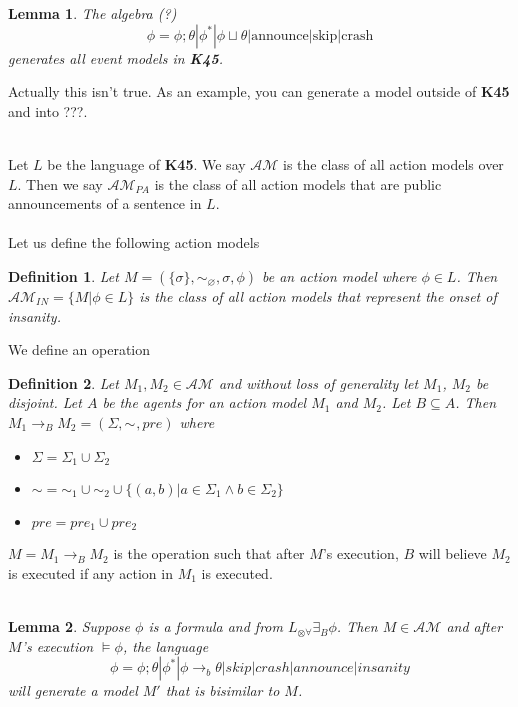 \documentclass[12pt, a4paper, titlepage]{scrartcl}
\newcommand{\aRel}[1] {
  \sim_{#1} 
}
\newcommand{\actModel}[3]{
  (#1, \aRel{#2}, #3)
}
\newtheorem{defn}{Definition}
\newtheorem{lemma}{Lemma}
\begin{document}
\begin{lemma}
	The algebra (?)
	\[
		\phi = \phi ; \theta | \phi ^{\ast} | \phi \sqcup \theta | \text{announce} |
		\text{skip} | \text{crash}
	\]
	generates all event models in {\bf K45}.
\end{lemma}

\begin{note}
	Actually this isn't true.
	As an example, you can generate a model outside of {\bf K45} and into ???.\\
\end{note}
\\
Let $L$ be the language of {\bf K45}.
We say $\mathcal{AM}$ is the class of all action models over $L$.
Then we say $\mathcal{AM}_{PA}$ is the class of all action models that
are public announcements of a sentence in $L$.\\
\\
Let us define the following action models
\begin{defn} \label{insanity}
Let $M = \actModel{\{\sigma\}}{\varnothing}{{\sigma, \phi}}$ be an action model
where $\phi \in L$.
Then $\mathcal{AM}_{IN} = \{M | \phi \in L\}$ is the class of all action models
that represent the onset of insanity.
\end{defn}

We define an operation
\begin{defn} \label{believe}
Let $M_1, M_2 \in \mathcal{AM}$ and without loss of generality let $M_1$, $M_2$
be disjoint.
Let $A$ be the agents for an action model $M_1$ and $M_2$.
Let $B \subseteq A$.
Then $M_1 \rightarrow_B M_2 = \actModel{\Sigma}{}{pre}$ where
\begin{itemize}
  \item $\Sigma = \Sigma_1 \cup \Sigma_2$
  \item $\sim = \sim_1 \cup \sim_2 \cup \{(a, b) | a \in \Sigma_1 \land b \in
  \Sigma_2 \}$
  \item $pre = pre_1 \cup pre_2$
\end{itemize}
\end{defn}
$M = M_1 \rightarrow_B M_2$ is the operation such that after $M$'s execution, $B$ will
believe $M_2$ is executed if any action in $M_1$ is executed.\\
\\
\begin{lemma} \label{gen_trees}
Suppose $\phi$ is a formula and from $L_{\otimes \forall} \exists_B \phi$.
Then $M \in \mathcal{AM}$ and after $M$'s execution $\models \phi$, the language
\[
  \phi = \phi ; \theta | \phi ^ {\ast} | \phi \rightarrow_b \theta | skip |
  crash | announce | insanity
\]
will generate a model $M'$ that is bisimilar to $M$.
\end{lemma}
\end{document}
